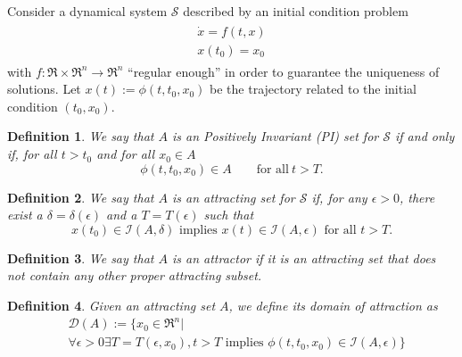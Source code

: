 \documentclass[letterpaper,10pt,twocolumn,journal,final]{IEEEtran}
\newtheorem{dfn}{Definition}
\newcommand{\eps}{\epsilon}
\begin{document}
Consider a dynamical system $\mathcal{S}$ described by an initial condition problem
\begin{align}\label{eq:dynsys}
	\begin{array}{l}
		\dot x = f(t,x)\\
		x(t_0)=x_0
	\end{array}
\end{align}
with $f:\Re\times\Re^n\rightarrow\Re^n$ ``regular enough'' in order to guarantee the uniqueness of solutions.
Let $x(t):=\phi(t,t_0,x_0)$ be the trajectory related to the initial condition $(t_0,x_0)$.
%
\begin{dfn}
	We say that $A$ is an Positively Invariant (PI) set for $\mathcal{S}$ if and only if, for all $t>t_0$ and for all $x_0 \in A$
	\begin{equation}\nonumber
		\phi(t,t_0,x_0) \in A \qquad \text{for all}~t>T.
	\end{equation}
\end{dfn}
\begin{dfn}
	We say that $A$ is an attracting set for $\mathcal{S}$ if, for any $\eps>0$, there exist a $\delta=\delta(\eps)$ and a $T=T(\eps)$ such that
	\begin{equation}
		x(t_0)\in \mathcal{I}(A,\delta) \text{ implies }
			x(t) \in \mathcal{I}(A,\eps) \text{ for all } t>T.
	\end{equation}
\end{dfn}
\begin{dfn}
	We say that $A$ is an attractor if it is an attracting set that does not contain any other proper attracting subset.
\end{dfn}
\begin{dfn}
	Given an attracting set $A$, we define its domain of attraction as
	\begin{align*}
		& \mathcal{D}(A):=\{x_0\in\Re^n|\\
			& \forall\eps>0 \exists T=T(\eps,x_0), t>T \text{ implies } \phi(t,t_0,x_0)\in \mathcal{I}(A,\eps) \}
	\end{align*}
\end{dfn}
\end{document}
